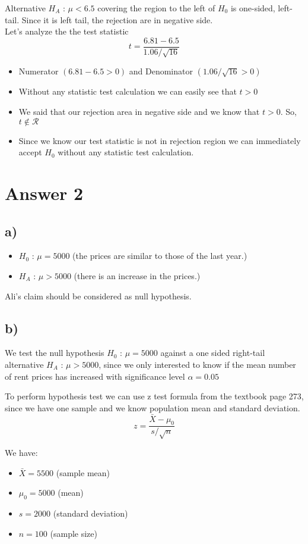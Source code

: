 \documentclass[12pt]{article}
\begin{document}
Alternative $H_A$ : $\mu < 6.5$ covering the region to the left of $H_0$ is one-sided, left-tail. Since it is left tail, the rejection are in negative side.\\

Let's analyze the the test statistic
$$t = \dfrac{6.81 - 6.5}{1.06/\sqrt{16}}$$
\begin{itemize}
    \item Numerator $(6.81 - 6.5 > 0)$ and Denominator $(1.06/\sqrt{16} > 0)$
    \item Without any statistic test calculation we can easily see that $t>0$
    \item We said that our rejection area in negative side and we know that $t>0$. So, $t \notin \mathcal{R}$
    \item Since we know our test statistic is not in rejection region we can immediately accept $H_0$ without any statistic test calculation.
\end{itemize}


\section*{Answer 2}

\subsection*{a)}
\begin{itemize}
    \item $H_0$ : $\mu = 5000$ (the prices are similar to those of the last year.)
    \item $H_A$ : $\mu > 5000$ (there is an increase in the prices.)
\end{itemize}
Ali's claim should be considered as null hypothesis.

\subsection*{b)} 
We test the null hypothesis $H_0$ : $\mu = 5000$ against a one sided right-tail alternative $H_A$ : $\mu > 5000$, since we only interested to know if the mean number of rent prices has increased with significance level $\alpha = 0.05$

To perform hypothesis test we can use z test formula from the textbook page 273, since we have one sample and we know population mean and standard deviation.
$$z = \dfrac{\bar{X}-\mu_0}{s/\sqrt{n}}$$

We have: 
\begin{itemize}
    \item $\bar{X} = 5500$ (sample mean)
    \item $\mu_0 = 5000$ (mean)
    \item $s= 2000$ (standard deviation)
    \item $n=100$ (sample size)
\end{itemize}
\end{document}
